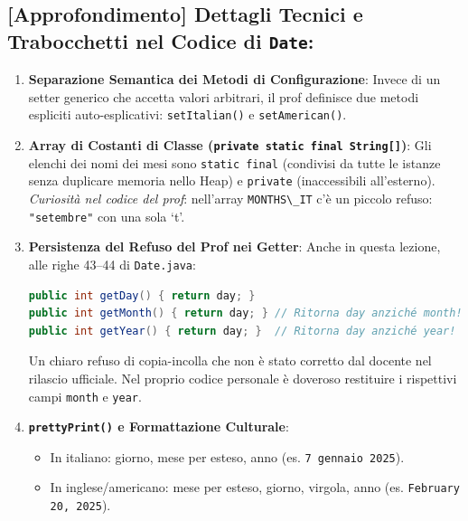 \documentclass[11pt,a4paper,oneside]{report}
\newcommand{\passthrough}[1]{#1}
\providecommand{\tightlist}{\setlength{\itemsep}{0pt}\setlength{\parskip}{0pt}}
\begin{document}
\subsection{\texorpdfstring{{[}Approfondimento{]} Dettagli Tecnici e
Trabocchetti nel Codice di
\texttt{Date}:}{{[}Approfondimento{]} Dettagli Tecnici e Trabocchetti nel Codice di Date:}}\label{chap07_approfondimento-dettagli-tecnici-e-trabocchetti-nel-codice-di-date}

\begin{enumerate}
\def\labelenumi{\arabic{enumi}.}
\item
  \textbf{Separazione Semantica dei Metodi di Configurazione}: Invece di
  un setter generico che accetta valori arbitrari, il prof definisce due
  metodi espliciti auto-esplicativi:
  \passthrough{\lstinline!setItalian()!} e
  \passthrough{\lstinline!setAmerican()!}.
\item
  \textbf{Array di Costanti di Classe
  (\passthrough{\lstinline!private static final String[]!})}: Gli
  elenchi dei nomi dei mesi sono \passthrough{\lstinline!static final!}
  (condivisi da tutte le istanze senza duplicare memoria nello Heap) e
  \passthrough{\lstinline!private!} (inaccessibili all'esterno).
  \emph{Curiosità nel codice del prof}: nell'array
  \passthrough{\lstinline!MONTHS\_IT!} c'è un piccolo refuso:
  \passthrough{\lstinline!"setembre"!} con una sola `t'.
\item
  \textbf{Persistenza del Refuso del Prof nei Getter}: Anche in questa
  lezione, alle righe 43--44 di \passthrough{\lstinline!Date.java!}:

\begin{lstlisting}[language=Java]
public int getDay() { return day; }
public int getMonth() { return day; } // Ritorna day anziché month!
public int getYear() { return day; }  // Ritorna day anziché year!
\end{lstlisting}

  Un chiaro refuso di copia-incolla che non è stato corretto dal docente
  nel rilascio ufficiale. Nel proprio codice personale è doveroso
  restituire i rispettivi campi \passthrough{\lstinline!month!} e
  \passthrough{\lstinline!year!}.
\item
  \textbf{\passthrough{\lstinline!prettyPrint()!} e Formattazione
  Culturale}:

  \begin{itemize}
  \tightlist
  \item
    In italiano: giorno, mese per esteso, anno (es.
    \passthrough{\lstinline!7 gennaio 2025!}).
  \item
    In inglese/americano: mese per esteso, giorno, virgola, anno (es.
    \passthrough{\lstinline!February 20, 2025!}).
  \end{itemize}
\end{enumerate}
\end{document}
